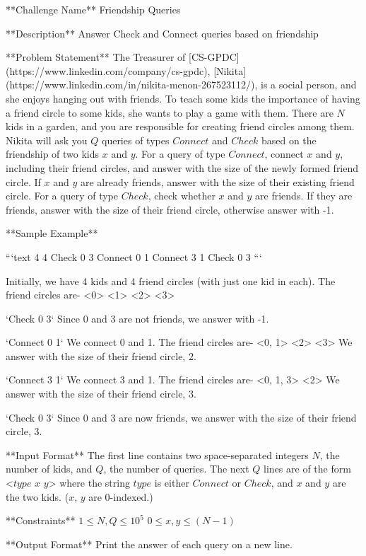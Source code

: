**Challenge Name**  
Friendship Queries

**Description**  
Answer Check and Connect queries based on friendship

**Problem Statement**  
The Treasurer of [CS-GPDC](https://www.linkedin.com/company/cs-gpdc), [Nikita](https://www.linkedin.com/in/nikita-menon-267523112/), is a social person, and she enjoys hanging out with friends. To teach some kids the importance of having a friend circle to some kids, she wants to play a game with them. There are $N$ kids in a garden, and you are responsible for creating friend circles among them. Nikita will ask you $Q$ queries of types $Connect$ and $Check$ based on the friendship of two kids $x$ and $y$. For a query of type $Connect$, connect $x$ and $y$, including their friend circles, and answer with the size of the newly formed friend circle. If $x$ and $y$ are already friends, answer with the size of their existing friend circle. For a query of type $Check$, check whether $x$ and $y$ are friends. If they are friends, answer with the size of their friend circle, otherwise answer with -1.  

**Sample Example**  

```text
4 4
Check 0 3
Connect 0 1
Connect 3 1
Check 0 3
```

Initially, we have 4 kids and 4 friend circles (with just one kid in each).  
The friend circles are- <0> <1> <2> <3>  

`Check 0 3`  
Since 0 and 3 are not friends, we answer with -1.  

`Connect 0 1`  
We connect 0 and 1.  
The friend circles are- <0, 1> <2> <3>  
We answer with the size of their friend circle, 2.  

`Connect 3 1`  
We connect 3 and 1.  
The friend circles are- <0, 1, 3> <2>  
We answer with the size of their friend circle, 3.  

`Check 0 3`  
Since 0 and 3 are now friends, we answer with the size of their friend circle, 3.  



**Input Format**  
The first line contains two space-separated integers $N$, the number of kids, and $Q$, the number of queries.  
The next $Q$ lines are of the form <$type$ $x$ $y$> where the string $type$ is either $Connect$ or $Check$, and $x$ and $y$ are the two kids. ($x$, $y$ are 0-indexed.)

**Constraints**  
$1 \leq N, Q \leq 10^5$  
$0 \leq x, y \leq (N-1)$  

**Output Format**  
Print the answer of each query on a new line.
